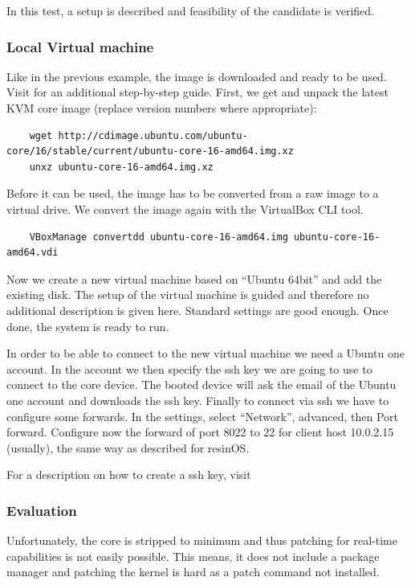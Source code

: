 \documentclass[]{scrartcl}
\begin{document}
In this test, a setup is described and feasibility of the candidate is verified.

\subsubsection{Local Virtual machine}

Like in the previous example, the image is downloaded and ready to be used. Visit \cite{ubuntu01} for an additional step-by-step guide.
First, we get and unpack the latest KVM core image (replace version numbers where appropriate):

\begin{verbatim}
	wget http://cdimage.ubuntu.com/ubuntu-core/16/stable/current/ubuntu-core-16-amd64.img.xz
	unxz ubuntu-core-16-amd64.img.xz
\end{verbatim}

Before it can be used, the image has to be converted from a raw image to a virtual drive. We convert the image again with the VirtualBox CLI tool.

\begin{verbatim}
	VBoxManage convertdd ubuntu-core-16-amd64.img ubuntu-core-16-amd64.vdi
\end{verbatim}

Now we create a new virtual machine based on ``Ubuntu 64bit'' and add the existing disk. The setup of the virtual machine is guided and therefore no additional description is given here. Standard settings are good enough. Once done, the system is ready to run.

In order to be able to connect to the new virtual machine we need a Ubuntu one account. In the account we then specify the ssh key we are going to use to connect to the core device. The booted device will ask the email of the Ubuntu one account and downloads the ssh key. Finally to connect via ssh we have to configure some forwards. In the settings, select ``Network'', advanced, then Port forward. Configure now the forward of port 8022 to 22 for client host 10.0.2.15 (usually), the same way as described for resinOS.

For a description on how to create a ssh key, visit \cite{atlassian01}

\subsubsection{Evaluation}

Unfortunately, the core is stripped to minimum and thus patching for real-time capabilities is not easily possible. This means, it does not include a package manager and patching the kernel is hard as a patch command not installed.
\end{document}
